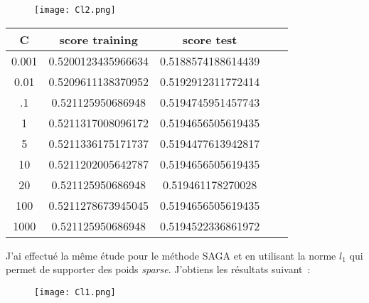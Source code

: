 \documentclass[12pt]{scrartcl} %
\begin{document}
\begin{figure}[h]
\centering
\texttt{[image: Cl2.png]}
\end{figure}
\newline
\begin{table}[h]
\centering
\begin{adjustbox}{max width=\textwidth}
\begin{tabular}{|c|c|c|c|c|}
 C &score training & score test\\
\hline
 0.001 & 0.5200123435966634& 0.5188574188614439 \\
0.01 &  0.5209611138370952& 0.5192912311772414 \\
.1 & 0.521125950686948& 0.5194745951457743 \\
1 & 0.5211317008096172& 0.5194656505619435 \\
5 &  0.5211336175171737& 0.5194477613942817 \\
10 & 0.5211202005642787& 0.5194656505619435 \\
20 & 0.521125950686948& 0.519461178270028 \\
100 & 0.5211278673945045& 0.5194656505619435 \\
1000 & 0.521125950686948& 0.5194522336861972
\end{tabular}
\end{adjustbox}
\end{table}
\newline
J'ai effectué la même étude pour le méthode SAGA et en utilisant la norme $l_1$ qui permet de supporter des poids \textit{sparse}. J'obtiens les résultats suivant~:
\begin{figure}[h!]
\centering
\texttt{[image: Cl1.png]}
\end{figure}
\end{document}

